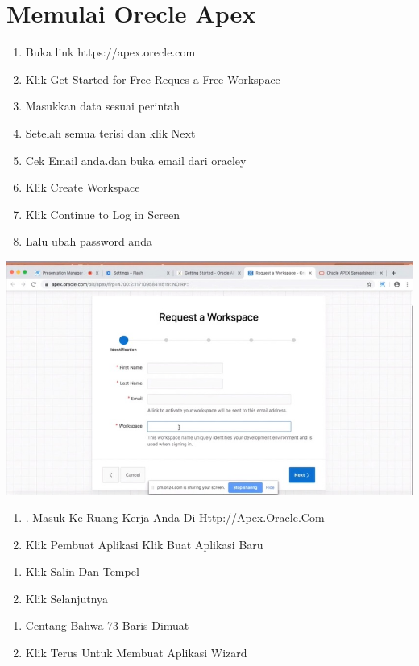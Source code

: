 \documentclass{article}
\begin{document}
\section{Memulai Orecle Apex}
\usepackage{Langkah 1.1:}
\begin{enumerate}
    \item Buka link https://apex.orecle.com
    \item Klik Get Started for Free
    \itemKlik Reques a Free Workspace
    \item Masukkan data sesuai perintah 
    \item Setelah semua terisi dan klik Next
    \item Cek Email anda.dan buka email dari oracley
    \item Klik Create Workspace
    \item Klik Continue to Log in Screen
    \item Lalu ubah password anda\\

\end{enumerate}
\begin{center}
    \includegraphics[width=10cm\textwidth]{gambar/request.jpg}
\end{center}
\begin{enumerate}
    \item . Masuk Ke Ruang Kerja Anda Di Http://Apex.Oracle.Com
\item Klik Pembuat Aplikasi Klik Buat Aplikasi Baru
\end{enumerate}
\begin{enumerate}
    \item 	Klik Salin Dan Tempel
    \item Klik Selanjutnya\\
\end{enumerate}

\begin{enumerate}
    \item Centang Bahwa 73 Baris Dimuat
    \item Klik Terus Untuk Membuat Aplikasi Wizard

\end{enumerate}
\end{document}
